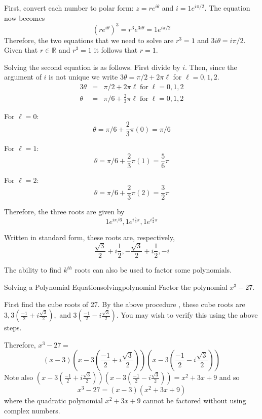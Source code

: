 \begin{solution}
First, convert each number to polar form: $z = re^{i\theta}$ and $i = 1 e^{i \pi/2}$. The equation now becomes
\[
(re^{i\theta})^3 = r^3 e^{3i\theta} = 1 e^{i \pi/2}
\]
Therefore, the two equations that we need to solve are $r^3 = 1$ and $3i\theta = i \pi/2$. Given that $r \in \mathbb{R}$ and $r^3 = 1$ it follows that $r=1$. 

Solving the second equation is as follows. First divide by $i$. Then, since the argument of $i$ is not unique we write $3\theta = \pi/2 + 2\pi\ell$ for $\ell = 0,1,2$. 
\begin{eqnarray*}
3\theta &=& \pi/2 + 2\pi\ell \; \mbox{for} \; \ell = 0,1,2 \\
\theta &=& \pi/6 + \frac{2}{3} \pi\ell \; \mbox{for} \; \ell = 0,1,2 
\end{eqnarray*}

For $\ell = 0$:
\[
\theta = \pi/6 + \frac{2}{3} \pi (0) = \pi/6
\]

For $\ell = 1$:
\[
\theta = \pi/6 + \frac{2}{3} \pi(1) = \frac{5}{6} \pi
\]

For $\ell = 2$:
\[
\theta = \pi/6 + \frac{2}{3} \pi(2) = \frac{3}{2} \pi
\]

Therefore, the three roots are given by \[
1e^{i \pi/6}, 1e^{i \frac{5}{6}\pi}, 1e^{i \frac{3}{2}\pi}
\]

Written in standard form, these roots are, respectively,
\[
\frac{\sqrt{3}}{2} + i \frac{1}{2}, -\frac{\sqrt{3}}{2} + i \frac{1}{2}, -i
\]

\end{solution}

The ability to find $k^{th}$ roots can also be used to factor some
polynomials.

\begin{example}{Solving a Polynomial Equation}{solvingpolynomial}
Factor the polynomial $x^{3}-27.$
\end{example}

\begin{solution}
First find the cube roots of 27. By the above procedure
, these cube roots
are $3,3\left( \displaystyle
\frac{-1}{2}+i\displaystyle\frac{\sqrt{3}}{2}\right) ,$ and $3\left( 
\displaystyle\frac{-1}{2}-i\displaystyle\frac{\sqrt{3}}{2}\right) $. You may wish to verify 
this using the above steps.

Therefore, $x^{3}-27 =$
\begin{equation*}
 \left( x-3\right) \left( x-3\left( \frac{-1}{2}+i\frac{\sqrt{3}}{2}\right)
\right) \left( x-3\left( \frac{-1}{2}-i\frac{\sqrt{3}}{2}\right) \right) 
\end{equation*}
Note also $\left( x-3\left( \frac{-1}{2}+i\frac{\sqrt{3}}{2}\right) \right)
\left( x-3\left( \frac{-1}{2}-i\frac{\sqrt{3}}{2}\right) \right)
=\allowbreak x^{2}+3x+9$ and so
\begin{equation*}
x^{3}-27=\left( x-3\right) \left( x^{2}+3x+9\right)
\end{equation*}
where the quadratic polynomial $x^{2}+3x+9$ cannot be factored without using
complex numbers.
\end{solution}

